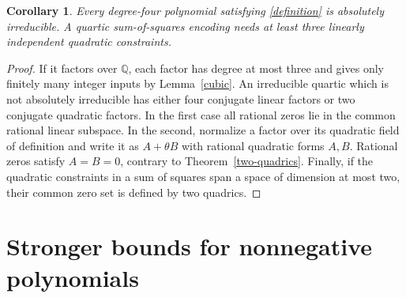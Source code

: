 \documentclass[11pt]{article}
\newtheorem{corollary}[theorem]{Corollary}
\theoremstyle{remark}\newtheorem{remark}[theorem]{Remark}
\newcommand{\Q}{\mathbb Q}\newcommand{\Z}{\mathbb Z}\newcommand{\R}{\mathbb R}
\begin{document}
\begin{corollary}\label{quartic-irreducible}
Every degree-four polynomial satisfying \eqref{definition} is absolutely irreducible. A quartic sum-of-squares encoding needs at least three linearly independent quadratic constraints.
\end{corollary}
\begin{proof}
If it factors over \(\Q\), each factor has degree at most three and gives only finitely many integer inputs by Lemma~\ref{cubic}. An irreducible quartic which is not absolutely irreducible has either four conjugate linear factors or two conjugate quadratic factors. In the first case all rational zeros lie in the common rational linear subspace. In the second, normalize a factor over its quadratic field of definition and write it as \(A+\theta B\) with rational quadratic forms \(A,B\). Rational zeros satisfy \(A=B=0\), contrary to Theorem~\ref{two-quadrics}. Finally, if the quadratic constraints in a sum of squares span a space of dimension at most two, their common zero set is defined by two quadrics.
\end{proof}

\section{Stronger bounds for nonnegative polynomials}
\end{document}
